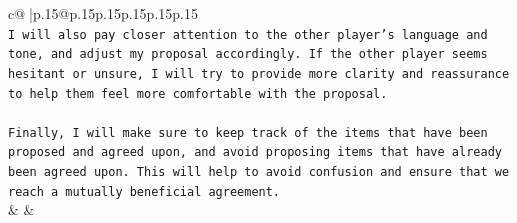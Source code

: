 \documentclass{article}
\begin{document}
{\begin{supertabular}{c@{$\;$}|p{.15\linewidth}@{}p{.15\linewidth}p{.15\linewidth}p{.15\linewidth}p{.15\linewidth}p{.15\linewidth}}
{{{\\ 
\texttt{I will also pay closer attention to the other player's language and tone, and adjust my proposal accordingly. If the other player seems hesitant or unsure, I will try to provide more clarity and reassurance to help them feel more comfortable with the proposal. } \\
\\ 
\texttt{Finally, I will make sure to keep track of the items that have been proposed and agreed upon, and avoid proposing items that have already been agreed upon. This will help to avoid confusion and ensure that we reach a mutually beneficial agreement.} \\
            }
        }
    }
    & & \\ \\


\end{supertabular}}
\end{document}
